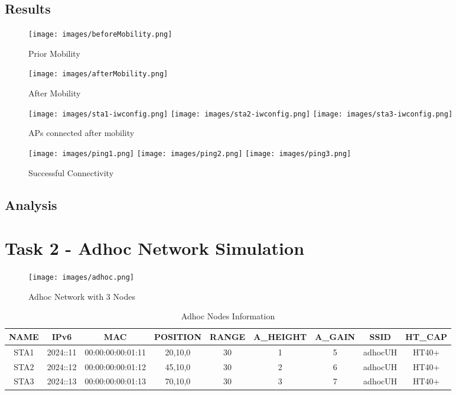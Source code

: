 \documentclass{article}
\begin{document}
\subsection{Results}
    \begin{figure}[h]
        \texttt{[image: images/beforeMobility.png]}
        \caption{Prior Mobility}
        \label{MininetGUI}
        \endminipage
        \texttt{[image: images/afterMobility.png]}
        \caption{After Mobility}
        \label{MininetGUI}
        \endminipage\vspace{10pt}
        \texttt{[image: images/sta1-iwconfig.png]}
        \texttt{[image: images/sta2-iwconfig.png]}
        \texttt{[image: images/sta3-iwconfig.png]}
        \caption{APs connected after mobility}
        \label{MininetCLI}
        \endminipage\vspace{10pt}
        \texttt{[image: images/ping1.png]}
        \texttt{[image: images/ping2.png]}
        \texttt{[image: images/ping3.png]}
        \caption{Successful Connectivity}
        \label{MininetCLI}
        \endminipage
    \end{figure}
\subsection{Analysis}

\newpage
\section{Task 2 - Adhoc Network Simulation}
    \begin{figure}[h]
        \centering
        \texttt{[image: images/adhoc.png]}
        \caption{Adhoc Network with 3 Nodes}
        \label{fig:adhocNetwork}
    \end{figure}
    \begin{table}[h]
        \begin{tabular}{|c|c|c|c|c|c|c|c|c|}
        \hline
        NAME & IPv6 & MAC & POSITION & RANGE & A\_HEIGHT & A\_GAIN & SSID & HT\_CAP\\
        \hline
        STA1 & 2024::11 & 00:00:00:00:01:11 & 20,10,0 & 30 & 1 & 5 & adhocUH & HT40+ \\
        STA2 & 2024::12 & 00:00:00:00:01:12 & 45,10,0 & 30 & 2 & 6 & adhocUH & HT40+ \\
        STA3 & 2024::13 & 00:00:00:00:01:13 & 70,10,0 & 30 & 3 & 7 & adhocUH & HT40+ \\
        \hline
        \end{tabular}
        \caption{Adhoc Nodes Information}
        \label{tab:3}
    \end{table}
\newpage
\end{document}
